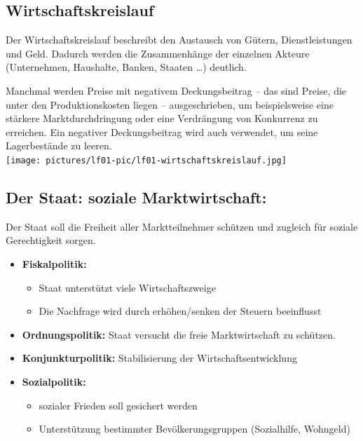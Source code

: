 
\subsection{Wirtschaftskreislauf}

Der Wirtschaftskreislauf beschreibt den Austausch von Gütern, Dienstleistungen und Geld. Dadurch werden die Zusammenhänge der einzelnen Akteure (Unternehmen, Haushalte, Banken, Staaten \dots) deutlich.

Manchmal werden Preise mit negativem Deckungsbeitrag -- das sind Preise, die unter den Produktionskosten liegen -- ausgeschrieben, um beispielsweise eine stärkere Marktdurchdringung oder eine Verdrängung von Konkurrenz zu erreichen. Ein negativer Deckungsbeitrag wird auch verwendet, um seine Lagerbestände zu leeren. \\
\texttt{[image: pictures/lf01-pic/lf01-wirtschaftskreislauf.jpg]}


\subsection{Der Staat: soziale Marktwirtschaft:}

Der Staat soll die Freiheit aller Marktteilnehmer schützen und zugleich für soziale Gerechtigkeit sorgen.

\begin{itemize}
	\item \textbf{Fiskalpolitik:} 
	\begin{itemize}
		\item Staat unterstützt viele Wirtschaftszweige
		\item Die Nachfrage wird durch erhöhen/senken der Steuern beeinflusst
	\end{itemize}
	\item \textbf{Ordnungspolitik:} Staat versucht die freie Marktwirtschaft zu schützen.
	\item \textbf{Konjunkturpolitik:} Stabilisierung der Wirtschaftsentwicklung
	\item \textbf{Sozialpolitik:} 
	\begin{itemize}
		\item sozialer Frieden soll gesichert werden
		\item Unterstützung bestimmter Bevölkerungsgruppen (Sozialhilfe, Wohngeld)
	\end{itemize}
\end{itemize}
	

